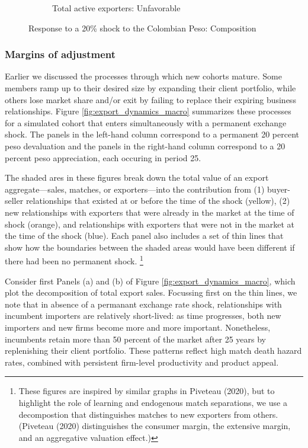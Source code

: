 \documentclass[12pt]{article}
\begin{document}
\begin{figure}[tbp]
\begin{subfigure}[b]{0.45\textwidth}
        \caption{Total active exporters: Unfavorable}
    \end{subfigure}
\caption{Response to a 20\% shock to the Colombian Peso: Composition}
\label{fig:export_dynamics_average}
\end{figure}

\subsubsection{Margins of adjustment}

Earlier we discussed the processes through which new cohorts mature. Some members ramp up to their desired size by expanding their client portfolio, while others lose market share and/or exit by failing to replace their expiring business relationships. Figure \ref{fig:export_dynamics_macro} summarizes these processes for a simulated cohort that enters simultaneously with a permanent exchange shock. The panels in the left-hand column correspond to a permanent 20 percent peso devaluation and the panels in the right-hand column correspond to a 20 percent peso appreciation, each occuring in period 25. 

The shaded ares in these figures break down the total value of an export aggregate---sales, matches, or exporters---into the contribution from (1) buyer-seller relationships that existed at or before the time of the shock (yellow), (2) new relationships with exporters
that were already in the market at the time of shock (orange), and
relationships with exporters that were not in the market at the time of the
shock (blue). Each panel also includes a set of thin lines that show how the boundaries between the shaded areas would have been different if there had been no permanent shock.%
\footnote{%
These figures are inspired by similar graphs in Piveteau (2020), but to
highlight the role of learning and endogenous match separations, we use a
decompostion that distinguishes matches to new exporters from others. (Piveteau (2020) distinguishes the consumer margin, the extensive margin, and
an aggregative valuation effect.)} 

Consider first Panels (a) and (b) of Figure \ref{fig:export_dynamics_macro}, which plot the decomposition of total export sales. Focussing first on the thin lines, we note that in absence of a permanant exchange rate shock, relationships with incumbent importers are relatively short-lived: as time progresses, both new importers and new firms become more and more
important. Nonetheless, incumbents retain more than 50 percent of the market
after 25 years by replenishing their client portfolio. These patterns reflect high match death hazard rates, combined with persistent firm-level productivity and product appeal.
\end{document}
